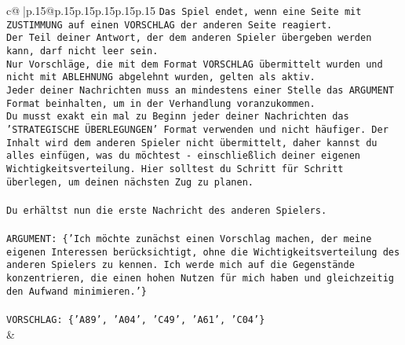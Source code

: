 \documentclass{article}
\begin{document}
{\begin{supertabular}{c@{$\;$}|p{.15\linewidth}@{}p{.15\linewidth}p{.15\linewidth}p{.15\linewidth}p{.15\linewidth}p{.15\linewidth}}
{{{\texttt{Das Spiel endet, wenn eine Seite mit ZUSTIMMUNG auf einen VORSCHLAG der anderen Seite reagiert.  } \\
\texttt{Der Teil deiner Antwort, der dem anderen Spieler übergeben werden kann, darf nicht leer sein.  } \\
\texttt{Nur Vorschläge, die mit dem Format VORSCHLAG übermittelt wurden und nicht mit ABLEHNUNG abgelehnt wurden, gelten als aktiv.  } \\
\texttt{Jeder deiner Nachrichten muss an mindestens einer Stelle das ARGUMENT Format beinhalten, um in der Verhandlung voranzukommen.} \\
\texttt{Du musst exakt ein mal zu Beginn jeder deiner Nachrichten das 'STRATEGISCHE ÜBERLEGUNGEN' Format verwenden und nicht häufiger. Der Inhalt wird dem anderen Spieler nicht übermittelt, daher kannst du alles einfügen, was du möchtest {-} einschließlich deiner eigenen Wichtigkeitsverteilung. Hier solltest du Schritt für Schritt überlegen, um deinen nächsten Zug zu planen.} \\
\\ 
\texttt{Du erhältst nun die erste Nachricht des anderen Spielers.} \\
\\ 
\texttt{ARGUMENT: \{'Ich möchte zunächst einen Vorschlag machen, der meine eigenen Interessen berücksichtigt, ohne die Wichtigkeitsverteilung des anderen Spielers zu kennen. Ich werde mich auf die Gegenstände konzentrieren, die einen hohen Nutzen für mich haben und gleichzeitig den Aufwand minimieren.'\}} \\
\\ 
\texttt{VORSCHLAG: \{'A89', 'A04', 'C49', 'A61', 'C04'\}} \\
            }
        }
    }
    & \\ \\


\end{supertabular}}
\end{document}
